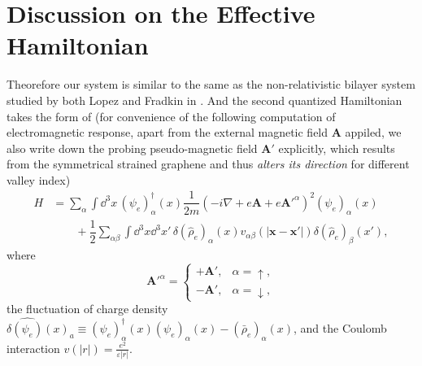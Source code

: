 \documentclass[bachelor,english,numbers]{ustcthesis}
\begin{document}
	\section{Discussion on the Effective Hamiltonian}
		\indent\par 

		Theorefore our system is similar to the same as the non-relativistic bilayer system studied by both Lopez and Fradkin in \cite{lopez1995fermionic,rajaraman1997generalized}. And the second quantized Hamiltonian takes the form of (for convenience of the following computation of electromagnetic response, apart from the external magnetic field $\bm{A}$ appiled, we also write down the probing pseudo-magnetic field $\bm{A'}$ explicitly, which results from the symmetrical strained graphene and thus \emph{alters its direction} for different valley index)
		\begin{align}\label{2.1.1}
			H&=\sum_\alpha\int\dd^3x\,(\psi_e)^\dagger_\alpha(x)\dfrac{1}{2m}\left(-i\nabla+e\bm{A}+e\bm{A'}^\alpha\right)^2(\psi_e)_\alpha(x)\nonumber\\
			&\qquad+\dfrac{1}{2}\sum_{\alpha \beta}\int\dd^3x\dd^3x'\,\delta(\hat{\rho}_e)_\alpha(x)v_{\alpha \beta}(|\bm{x}-\bm{x'}|)\delta(\hat{\rho}_e)_\beta(x'),
		\end{align}
		where 
		\begin{equation*}
			\bm{A'}^\alpha=\begin{cases}
				+\bm{A'},&\alpha=\uparrow,\\
				-\bm{A'},&\alpha=\downarrow,
			\end{cases}
		\end{equation*}
		the fluctuation of charge density $\delta\hat{(\psi_e)}(x)_a\equiv(\psi_e)^\dagger_\alpha(x)(\psi_e)_\alpha(x)-(\bar{\rho}_e)_\alpha(x)$, and the Coulomb interaction $v(|r|)=\frac{e^2}{\varepsilon |r|}$.
\end{document}
